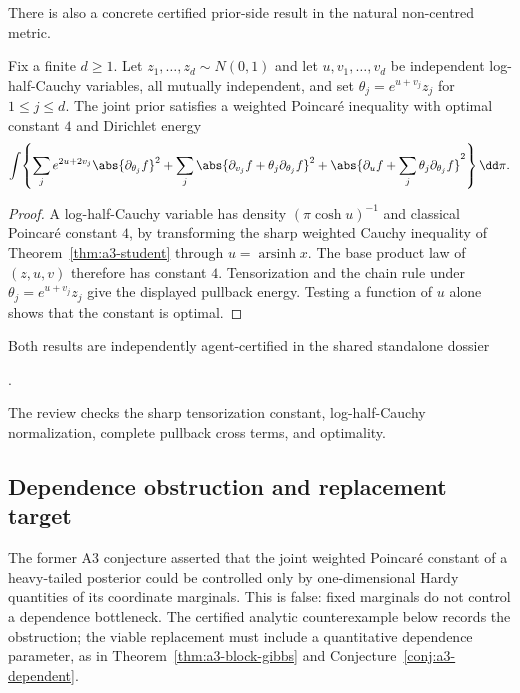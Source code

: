 \documentclass[../../main.tex]{subfiles}
\begin{document}
There is also a concrete certified prior-side result in the natural non-centred metric.

\begin{proposition}
\label{prop:a3-hierarchical-prior}
Fix a finite $d\ge1$. Let $z_1,\ldots,z_d\sim N(0,1)$ and let
$u,v_1,\ldots,v_d$ be independent log-half-Cauchy variables, all mutually independent, and set
$\theta_j=e^{u+v_j}z_j$ for $1\le j\le d$. The joint prior satisfies a weighted Poincar\'e inequality with
optimal constant $4$ and Dirichlet energy
\[
 \int\!\left\{
 \sum_j e^{2u+2v_j}\abs{\partial_{\theta_j}f}^2
 +\sum_j\abs{\partial_{v_j}f+\theta_j\partial_{\theta_j}f}^2
 +\abs{\partial_uf+\sum_j\theta_j\partial_{\theta_j}f}^2
 \right\}\dd\pi .
\]
\end{proposition}

\begin{proof}
A log-half-Cauchy variable has density $(\pi\cosh u)^{-1}$ and classical Poincar\'e constant
$4$, by transforming the sharp weighted Cauchy inequality of
Theorem~\ref{thm:a3-student} through $u=\operatorname{arsinh}x$. The base product law of
$(z,u,v)$ therefore has constant $4$. Tensorization and the chain rule under
$\theta_j=e^{u+v_j}z_j$ give the displayed pullback energy. Testing a function of $u$ alone shows
that the constant is optimal.
\end{proof}

\noindent Both results are independently agent-certified in the shared standalone dossier
\begin{center}\small
{}.
\end{center}
The review checks the sharp tensorization constant, log-half-Cauchy normalization, complete
pullback cross terms, and optimality.

\subsection{Dependence obstruction and replacement target}
\label{subsec:a3-theorem}

\begin{warning}
\label{warn:a3-marginal-only}
The former A3 conjecture asserted that the joint weighted Poincar\'e constant of a heavy-tailed
posterior could be controlled only by one-dimensional Hardy quantities of its coordinate
marginals. This is false: fixed marginals do not control a dependence bottleneck. The certified
analytic counterexample below records the obstruction; the viable replacement must include a
quantitative dependence parameter, as in Theorem~\ref{thm:a3-block-gibbs} and
Conjecture~\ref{conj:a3-dependent}.
\end{warning}
\end{document}

